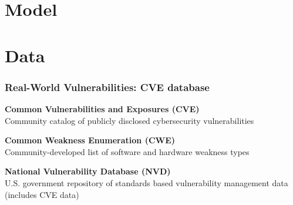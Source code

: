 \documentclass[169]{beamer}
\begin{document}
\section{Model}

\section{Data}

\begin{frame}\frametitle{Real-World Vulnerabilities: CVE database}
  \textbf{Common Vulnerabilities and Exposures (CVE)} \\
  Community catalog of publicly disclosed cybersecurity vulnerabilities

  \textbf{Common Weakness Enumeration (CWE)} \\
  Community-developed list of software and hardware weakness types

  \textbf{National Vulnerability Database (NVD)} \\
  U.S. government repository of standards based vulnerability management data (includes CVE data)
\end{frame}

\begin{frame}[label=current]
\end{frame}
\end{document}
